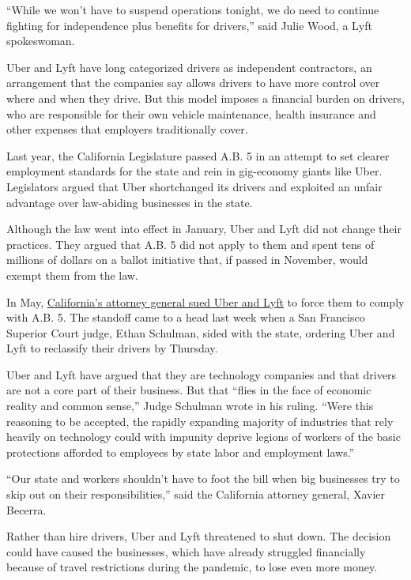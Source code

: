 ``While we won't have to suspend operations tonight, we do need to
continue fighting for independence plus benefits for drivers,'' said
Julie Wood, a Lyft spokeswoman.

Uber and Lyft have long categorized drivers as independent contractors,
an arrangement that the companies say allows drivers to have more
control over where and when they drive. But this model imposes a
financial burden on drivers, who are responsible for their own vehicle
maintenance, health insurance and other expenses that employers
traditionally cover.

Last year, the California Legislature passed A.B. 5 in an attempt to set
clearer employment standards for the state and rein in gig-economy
giants like Uber. Legislators argued that Uber shortchanged its drivers
and exploited an unfair advantage over law-abiding businesses in the
state.

Although the law went into effect in January, Uber and Lyft did not
change their practices. They argued that A.B. 5 did not apply to them
and spent tens of millions of dollars on a ballot initiative that, if
passed in November, would exempt them from the law.

In May,
\href{https://www.nytimes3xbfgragh.onion/2020/05/05/technology/california-uber-lyft-lawsuit.html}{California's
attorney general sued Uber and Lyft} to force them to comply with A.B.
5. The standoff came to a head last week when a San Francisco Superior
Court judge, Ethan Schulman, sided with the state, ordering Uber and
Lyft to reclassify their drivers by Thursday.

Uber and Lyft have argued that they are technology companies and that
drivers are not a core part of their business. But that ``flies in the
face of economic reality and common sense,'' Judge Schulman wrote in his
ruling. ``Were this reasoning to be accepted, the rapidly expanding
majority of industries that rely heavily on technology could with
impunity deprive legions of workers of the basic protections afforded to
employees by state labor and employment laws.''

``Our state and workers shouldn't have to foot the bill when big
businesses try to skip out on their responsibilities,'' said the
California attorney general, Xavier Becerra.

Rather than hire drivers, Uber and Lyft threatened to shut down. The
decision could have caused the businesses, which have already struggled
financially because of travel restrictions during the pandemic, to lose
even more money.


